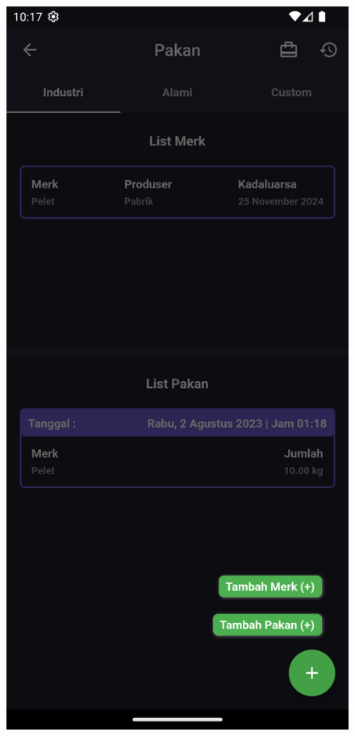\begin{spacing}{1.5}
\begin{enumerate}
\begin{itemize}
			\begin{figure}[H]
					\includegraphics[width=\linewidth]{gambar/sprint4/pakan_choose.png}

\end{figure}
\end{itemize}
\end{enumerate}
\end{spacing}
